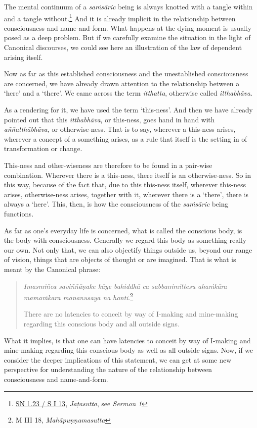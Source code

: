 The mental continuum of a \emph{saṁsāric} being is always knotted with a tangle within and a tangle without.\footnote{\href{https://suttacentral.net/sn1.23/pli/ms}{SN 1.23 / S I 13}, \emph{Jaṭāsutta}, see \emph{Sermon 1}} And it is already implicit in the relationship between consciousness and name-and-form. What happens at the dying moment is usually posed as a deep problem. But if we carefully examine the situation in the light of Canonical discourses, we could see here an illustration of the law of dependent arising itself.

Now as far as this established consciousness and the unestablished consciousness are concerned, we have already drawn attention to the relationship between a `here' and a `there'. We came across the term \emph{itthatta}, otherwise called \emph{itthabhāva}.

As a rendering for it, we have used the term `this-ness'. And then we have already pointed out that this \emph{itthabhāva}, or this-ness, goes hand in hand with \emph{aññatthābhāva}, or otherwise-ness. That is to say, wherever a this-ness arises, wherever a concept of a something arises, as a rule that itself is the setting in of transformation or change.

This-ness and other-wiseness are therefore to be found in a pair-wise combination. Wherever there is a this-ness, there itself is an otherwise-ness. So in this way, because of the fact that, due to this this-ness itself, wherever this-ness arises, otherwise-ness arises, together with it, wherever there is a `there', there is always a `here'. This, then, is how the consciousness of the \emph{saṁsāric} being functions.

As far as one's everyday life is concerned, what is called the conscious body, is the body with consciousness. Generally we regard this body as something really our own. Not only that, we can also objectify things outside us, beyond our range of vision, things that are objects of thought or are imagined. That is what is meant by the Canonical phrase:

\begin{quote}
\emph{Imasmiñca saviññāṇake kāye bahiddhā ca sabbanimittesu ahaṁkāra mamaṁkāra mānānusayā na honti}.\footnote{M III 18, \emph{Mahāpuṇṇamasutta}}

There are no latencies to conceit by way of I-making and mine-making regarding this conscious body and all outside signs.
\end{quote}

What it implies, is that one can have latencies to conceit by way of I-making and mine-making regarding this conscious body as well as all outside signs. Now, if we consider the deeper implications of this statement, we can get at some new perspective for understanding the nature of the relationship between consciousness and name-and-form.

